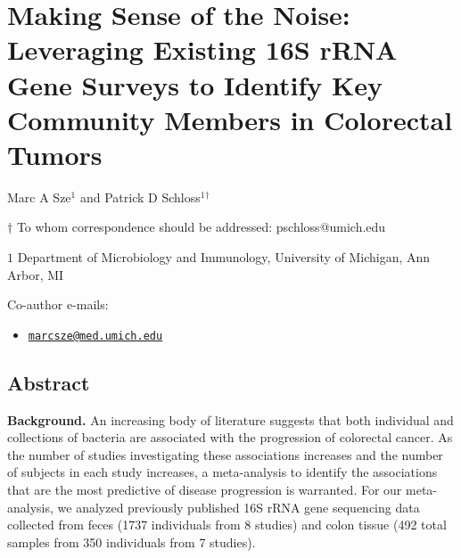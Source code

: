 \documentclass[12pt,]{article}
\title{}
\author{}
\date{}
\providecommand{\tightlist}{%
  \setlength{\itemsep}{0pt}\setlength{\parskip}{0pt}}
\begin{document}
\section{Making Sense of the Noise: Leveraging Existing 16S rRNA Gene
Surveys to Identify Key Community Members in Colorectal
Tumors}\label{making-sense-of-the-noise-leveraging-existing-16s-rrna-gene-surveys-to-identify-key-community-members-in-colorectal-tumors}

\begin{center}
\vspace{25mm}

Marc A Sze${^1}$ and Patrick D Schloss${^1}$${^\dagger}$

\vspace{20mm}

$\dagger$ To whom correspondence should be addressed: pschloss@umich.edu

$1$ Department of Microbiology and Immunology, University of Michigan, Ann Arbor, MI




\end{center}

Co-author e-mails:

\begin{itemize}
\tightlist
\item
  \href{mailto:marcsze@med.umich.edu}{\nolinkurl{marcsze@med.umich.edu}}
\end{itemize}

\newpage

\linenumbers

\subsection{Abstract}\label{abstract}

\textbf{Background.} An increasing body of literature suggests that both
individual and collections of bacteria are associated with the
progression of colorectal cancer. As the number of studies investigating
these associations increases and the number of subjects in each study
increases, a meta-analysis to identify the associations that are the
most predictive of disease progression is warranted. For our
meta-analysis, we analyzed previously published 16S rRNA gene sequencing
data collected from feces (1737 individuals from 8 studies) and colon
tissue (492 total samples from 350 individuals from 7 studies).
\end{document}
